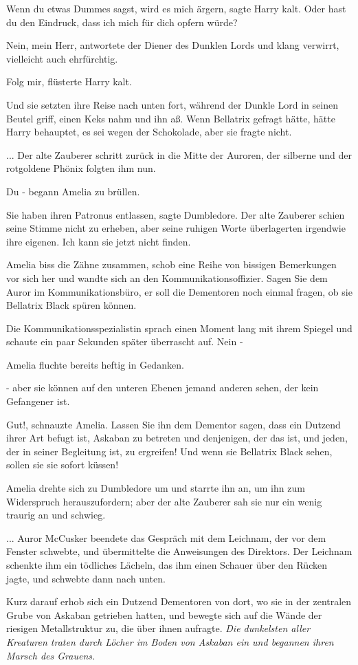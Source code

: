 \glqq{}Wenn du etwas Dummes sagst, wird es mich ärgern\grqq{}, sagte Harry kalt.
\glqq{}Oder hast du den Eindruck, dass ich mich für dich opfern würde?\grqq{}

\glqq{}Nein, mein Herr\grqq{}, antwortete der Diener des Dunklen Lords und klang
verwirrt, vielleicht auch ehrfürchtig.

\glqq{}Folg mir\grqq{}, flüsterte Harry kalt.

Und sie setzten ihre Reise nach unten fort, während der Dunkle Lord in seinen
Beutel griff, einen Keks nahm und ihn aß. Wenn Bellatrix gefragt hätte, hätte
Harry behauptet, es sei wegen der Schokolade, aber sie fragte nicht.

... Der alte Zauberer schritt zurück in die Mitte der Auroren, der silberne und
der rotgoldene Phönix folgten ihm nun.

\glqq{}Du -\grqq{} begann Amelia zu brüllen.

\glqq{}Sie haben ihren Patronus entlassen\grqq{}, sagte Dumbledore. Der alte
Zauberer schien seine Stimme nicht zu erheben, aber seine ruhigen Worte
überlagerten irgendwie ihre eigenen. \glqq{}Ich kann sie jetzt nicht finden.\grqq{}

Amelia biss die Zähne zusammen, schob eine Reihe von bissigen Bemerkungen vor
sich her und wandte sich an den Kommunikationsoffizier. \glqq{}Sagen Sie dem
Auror im Kommunikationsbüro, er soll die Dementoren noch einmal fragen, ob sie
Bellatrix Black spüren können.\grqq{}

Die Kommunikationsspezialistin sprach einen Moment lang mit ihrem Spiegel und
schaute ein paar Sekunden später überrascht auf. \glqq{}Nein -\grqq{}

Amelia fluchte bereits heftig in Gedanken.

\glqq{}- aber sie können auf den unteren Ebenen jemand anderen sehen, der kein
Gefangener ist.\grqq{}

\glqq{}Gut!\grqq{}, schnauzte Amelia. \glqq{}Lassen Sie ihn dem Dementor sagen,
dass ein Dutzend ihrer Art befugt ist, Askaban zu betreten und denjenigen, der
das ist, und jeden, der in seiner Begleitung ist, zu ergreifen! Und wenn sie
Bellatrix Black sehen, sollen sie sie sofort küssen!\grqq{}

Amelia drehte sich zu Dumbledore um und starrte ihn an, um ihn zum Widerspruch
herauszufordern; aber der alte Zauberer sah sie nur ein wenig traurig an und
schwieg.

... Auror McCusker beendete das Gespräch mit dem Leichnam, der vor dem Fenster
schwebte, und übermittelte die Anweisungen des Direktors. Der Leichnam schenkte
ihm ein tödliches Lächeln, das ihm einen Schauer über den Rücken jagte, und
schwebte dann nach unten.

Kurz darauf erhob sich ein Dutzend Dementoren von dort, wo sie in der zentralen
Grube von Askaban getrieben hatten, und bewegte sich auf die Wände der riesigen
Metallstruktur zu, die über ihnen aufragte. \emph{Die dunkelsten aller Kreaturen
traten durch Löcher im Boden von Askaban ein und begannen ihren Marsch des
Grauens.}

